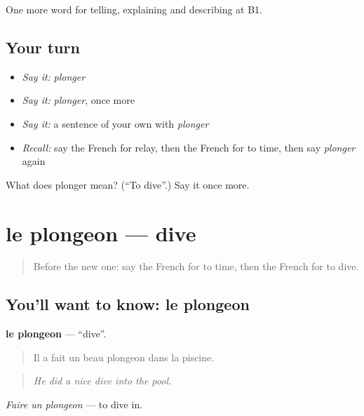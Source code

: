 \begin{grammarlens}[title={What you've built}]
One more word for telling, explaining and describing at B1.
\end{grammarlens}

\subsection*{Your turn}
\begin{itemize}
\raggedright
  \item \emph{Say it:} \emph{plonger}
  \item \emph{Say it:} \emph{plonger}, once more
  \item \emph{Say it:} a sentence of your own with \emph{plonger}
  \item \emph{Recall:} say the French for relay, then the French for to time, then say \emph{plonger} again
\end{itemize}

\begin{tcolorbox}[breakable,colback=teal!4,colframe=teal!35!black,title={Before you move on}]
What does plonger mean? (\textquotedblleft{}To dive\textquotedblright{}.) Say it once more.
\end{tcolorbox}
\section[le plongeon]{le plongeon — dive}

\label{lesson:FR-C509-plongeon}



\begin{quote}
Before the new one: say the French for to time, then the French for to dive.
\end{quote}

\subsection*{You'll want to know: le plongeon}
\textbf{le plongeon} — \textquotedblleft{}dive\textquotedblright{}.

\begin{quote}
Il a fait un beau plongeon dans la piscine.
\end{quote}

\begin{quote}
\emph{He did a nice dive into the pool.}
\end{quote}

\emph{Faire un plongeon} — to dive in.

